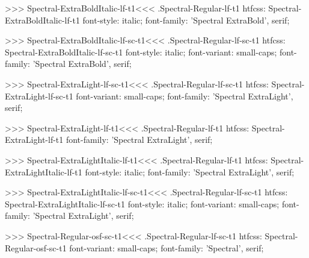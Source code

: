 >>>
\<Spectral-ExtraBoldItalic-lf-t1\><<<
.Spectral-Regular-lf-t1
htfcss:  Spectral-ExtraBoldItalic-lf-t1  font-style: italic; font-family: 'Spectral ExtraBold', serif;

>>>
\<Spectral-ExtraBoldItalic-lf-sc-t1\><<<
.Spectral-Regular-lf-sc-t1
htfcss:  Spectral-ExtraBoldItalic-lf-sc-t1  font-style: italic; font-variant: small-caps; font-family: 'Spectral ExtraBold', serif;

>>>
\<Spectral-ExtraLight-lf-sc-t1\><<<
.Spectral-Regular-lf-sc-t1
htfcss:  Spectral-ExtraLight-lf-sc-t1  font-variant: small-caps; font-family: 'Spectral ExtraLight', serif;

>>>
\<Spectral-ExtraLight-lf-t1\><<<
.Spectral-Regular-lf-t1
htfcss:  Spectral-ExtraLight-lf-t1  font-family: 'Spectral ExtraLight', serif;

>>>
\<Spectral-ExtraLightItalic-lf-t1\><<<
.Spectral-Regular-lf-t1
htfcss:  Spectral-ExtraLightItalic-lf-t1  font-style: italic; font-family: 'Spectral ExtraLight', serif;

>>>
\<Spectral-ExtraLightItalic-lf-sc-t1\><<<
.Spectral-Regular-lf-sc-t1
htfcss:  Spectral-ExtraLightItalic-lf-sc-t1  font-style: italic; font-variant: small-caps; font-family: 'Spectral ExtraLight', serif;

>>>
\<Spectral-Regular-osf-sc-t1\><<<
.Spectral-Regular-lf-sc-t1
htfcss:  Spectral-Regular-osf-sc-t1  font-variant: small-caps; font-family: 'Spectral', serif;

